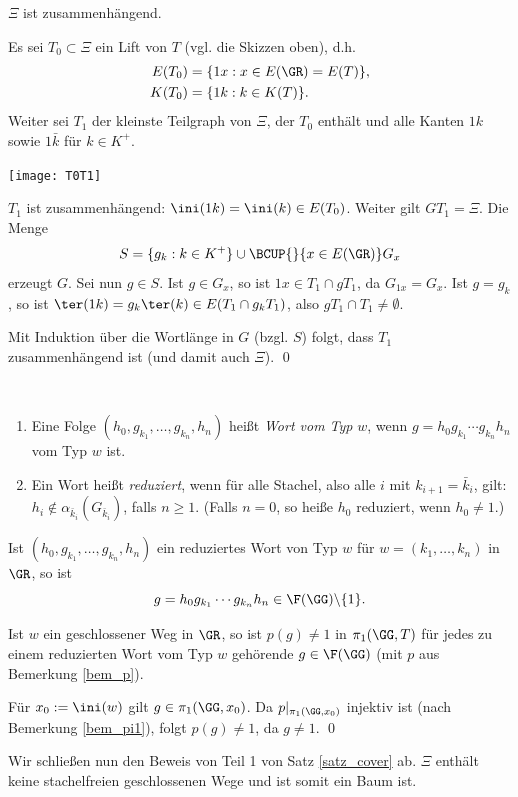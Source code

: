 \BEM $\Xi$ ist zusammenhängend.

\bew Es sei $T_0 \subset \Xi$ ein Lift von $T$ (vgl. die Skizzen 
oben), d.h.
\begin{align*}
E(T_0) &= \{ 1x : x\in E(\GR)=E(T) \}, \\
K(T_0) &= \{ 1k : k\in K(T) \}.
\end{align*}
Weiter sei $T_1$ der kleinste Teilgraph von $\Xi$, der $T_0$ enthält
und alle Kanten $1k$ sowie $1\bar{k}$ für $k\in K^+$.
\begin{center}
	\texttt{[image: T0T1]}
\end{center}
$T_1$ ist zusammenhängend: $\ini(1k)=\ini(k)\in E(T_0)$.
Weiter gilt  $GT_1 = \Xi$. Die Menge
\[
S = \{g_k : k\in K^+ \} \cup \BCUP{}{x\in E(\GR)} G_x
\]
erzeugt $G$. Sei nun $g\in S$. Ist $g \in G_x$, so ist
$1x \in T_1 \cap g T_1$, da $G_{1x}=G_x$.
Ist $g=g_k$, so ist $\ter(1k)=g_k \ter(k) \in E(T_1 \cap g_k T_1)$,
also $g T_1 \cap T_1 \neq \emptyset$.

Mit Induktion über die Wortlänge in $G$ (bzgl. $S$) folgt,
dass $T_1$ zusammenhängend ist (und damit auch $\Xi$).
\qed

\DEF\
\begin{enumerate}
\item Eine Folge $(h_0,g_{k_1},\ldots,g_{k_n},h_n)$ heißt
\emph{Wort vom Typ} $w$, wenn $g=h_0 g_{k_1}\cdots g_{k_n} h_n$
vom Typ $w$ ist.
\item Ein Wort heißt \emph{reduziert},
wenn für alle Stachel, also alle $i$ mit $k_{i+1}=\bar{k}_i$, gilt:
$h_i\not\in \alpha_{\bar{k}_i}(G_{\bar{k}_i})$, falls $n\geq 1$.
(Falls $n=0$, so heiße $h_0$ reduziert, wenn $h_0\neq 1$.)
\end{enumerate}

\PROP\label{prop_nicht_eins}
Ist $(h_0,g_{k_1},\ldots,g_{k_n},h_n)$ ein reduziertes Wort
von Typ $w$ für $w=(k_1,\ldots,k_n)$ in $\GR$, so ist
\[
g = h_0 g_{k_1}\cdots g_{k_n} h_n \in \F(\GG)\backslash\{ 1 \}.
\]

\FOLG Ist $w$ ein geschlossener Weg in $\GR$, so ist $p(g)\neq 1$
in $\pi_1(\GG,T)$ für jedes zu einem reduzierten Wort vom Typ $w$
gehörende $g\in \F(\GG)$ (mit $p$ aus Bemerkung \ref{bem_p}).

\bew Für $x_0 := \ini(w)$ gilt $g\in \pi_1(\GG,x_0)$.
Da $p|_{\pi_1(\GG,x_0)}$ injektiv ist (nach Bemerkung \ref{bem_pi1}),
folgt $p(g)\neq 1$, da $g\neq 1$.
\qed

Wir schließen nun den Beweis von Teil 1 von Satz \ref{satz_cover} ab.
\BEM $\Xi$ enthält keine stachelfreien geschlossenen
Wege und ist somit ein Baum ist.

